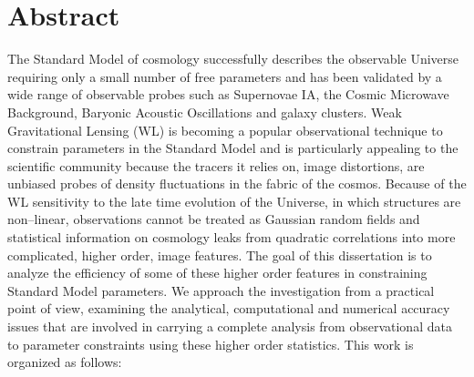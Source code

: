 \chapter*{Abstract} 

The Standard Model of cosmology successfully describes the observable Universe requiring only a small number of free parameters and has been validated by a wide range of observable probes such as Supernovae IA, the Cosmic Microwave Background, Baryonic Acoustic Oscillations and galaxy clusters. Weak Gravitational Lensing (WL) is becoming a popular observational technique to constrain parameters in the Standard Model and is particularly appealing to the scientific community because the tracers it relies on, image distortions, are unbiased probes of density fluctuations in the fabric of the cosmos. Because of the WL sensitivity to the late time evolution of the Universe, in which structures are non--linear, observations cannot be treated as Gaussian random fields and statistical information on cosmology leaks from quadratic correlations into more complicated, higher order, image features. The goal of this dissertation is to analyze the efficiency of some of these higher order features in constraining Standard Model parameters. We approach the investigation from a practical point of view, examining the analytical, computational and numerical accuracy issues that are involved in carrying a complete analysis from observational data to parameter constraints using these higher order statistics. This work is organized as follows:

